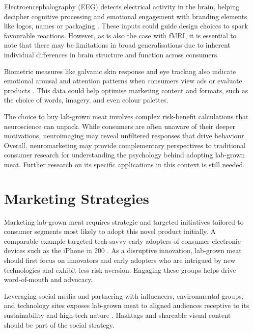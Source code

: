 \documentclass[10pt]{article}
\begin{document}
\begin{sloppypar}
  Electroencephalography (EEG) detects electrical activity in the brain, helping decipher cognitive processing and emotional engagement with branding elements like logos, names or packaging \citep{khushaba_consumer_2013}. These inputs could guide design choices to spark favourable reactions. However, as is also the case with fMRI, it is essential to note that there may be limitations in broad generalisations due to inherent individual differences in brain structure and function across consumers.


  Biometric measures like galvanic skin response and eye tracking also indicate emotional arousal and attention patterns when consumers view ads or evaluate products \citep{riedl_decade_2020}. This data could help optimise marketing content and formats, such as the choice of words, imagery, and even colour palettes.

  The choice to buy lab-grown meat involves complex risk-benefit calculations that neuroscience can unpack. While consumers are often unaware of their deeper motivations, neuroimaging may reveal unfiltered responses that drive behaviour. Overall, neuromarketing may provide complementary perspectives to traditional consumer research for understanding the psychology behind adopting lab-grown meat. Further research on its specific applications in this context is still needed.

  \section{Marketing Strategies}
  \label{sec:marketing-strategies}

  Marketing lab-grown meat requires strategic and targeted initiatives tailored to consumer segments most likely to adopt this novel product initially. A comparable example targeted tech-savvy early adopters of consumer electronic devices such as the iPhone in 200 \citep{vliert_apple_2021}. As a disruptive innovation, lab-grown meat should first focus on innovators and early adopters who are intrigued by new technologies and exhibit less risk aversion. Engaging these groups helps drive word-of-mouth and advocacy.

  Leveraging social media and partnering with influencers, environmental groups, and technology sites exposes lab-grown meat to aligned audiences receptive to its sustainability and high-tech nature \citep{goodwin_future_2013}. Hashtags and shareable visual content should be part of the social strategy.


\end{sloppypar}
\end{document}
